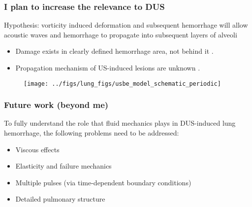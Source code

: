\begin{frame}\frametitle{\vspace*{0.5cm}I plan to increase the relevance to DUS}
  Hypothesis: vorticity induced deformation and subsequent hemorrhage will allow acoustic waves and hemorrhage to propagate into
  subsequent layers of alveoli\\
  \begin{itemize}
  \item Damage exists in clearly defined hemorrhage area, not behind it \citep{Penney1993a}.
  \item Propagation mechanism of US-induced lesions are unknown \citep{Zachary2006}.
  \end{itemize}
  \begin{figure}
    \centering
    \texttt{[image: ../figs/lung\_figs/usbe\_model\_schematic\_periodic]}
  \end{figure}
\end{frame}

\begin{frame}\frametitle{Future work (beyond me)}
  To fully understand the role that fluid mechanics plays in DUS-induced lung hemorrhage, the following problems need to be addressed:\\
  \vspace*{0.25cm}
  \begin{itemize}
  \item Viscous effects\vfill%
  \item Elasticity and failure mechanics\vfill%
  \item Multiple pulses (via time-dependent boundary conditions)\vfill%
  \item Detailed pulmonary structure\vfill%
  \end{itemize}
\end{frame}
%
